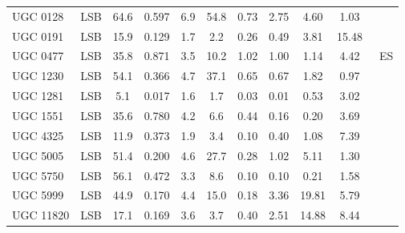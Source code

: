 \documentclass[preprint,aps]{revtex4}
\begin{document}
\begin{table}
\begin{tabular}{l c c c c c c c c c c}
\\
UGC 0128 &LSB&  64.6 &    0.597  &  6.9 & 54.8 & 0.73 & 2.75 & \phantom{0}4.60 & \phantom{0}1.03 &  \cite{Verheijen1999} \cite{deBlok1997} \cite{vanderHulst1993} \cite{vanderHulst1993}     
\\
UGC 0191 &LSB &15.9 &  0.129    & 1.7 & \phantom{0}2.2 & 0.26 & 0.49 &\phantom{0}3.81 &15.48 &   \cite{Kuzio2008} \cite{vanZee2000} \cite{vanZee2000} \cite{vanZee1997}    
\\
UGC 0477 & LSB &35.8 &  0.871    &3.5 &10.2 & 1.02& 1.00 & \phantom{0}1.14 & \phantom{0}4.42 &     \cite{Kuzio2006} \cite{Fisher1981} ~ES   \cite{Fisher1981}
\\
UGC 1230 &LSB& 54.1&   0.366   & 4.7 & 37.1 & 0.65 & 0.67 &\phantom{0}1.82 & \phantom{0}0.97 &    \cite{deBlok1997} \cite{deBlok1997} \cite{vanderHulst1993} \cite{vanderHulst1993}
\\
UGC 1281 & LSB & \phantom{0}5.1 &0.017& 1.6& \phantom{0}1.7 &0.03&0.01 & \phantom{0}0.53 &\phantom{0}3.02 &    \cite{Kuzio2006} \cite{deBlok2002} \cite{deBlok2002} \cite{Swaters2002a}    
\\
UGC 1551 &LSB & 35.6 &   0.780   & 4.2 & \phantom{0}6.6 & 0.44 & 0.16 &\phantom{0}0.20 & \phantom{0}3.69 &    \cite{Kuzio2008} \cite{Swaters2002b} \cite{deJong1996} \cite{Swaters2002b}    
\\
UGC 4325 &LSB& 11.9 &  0.373    & 1.9 & \phantom{0}3.4 & 0.10 &0.40 & \phantom{0}1.08 & \phantom{0}7.39&   \cite{Kuzio2008} \cite{Swaters2002a} \cite{deBlok2002} \cite{Swaters2002a}    
\\
UGC 5005 & LSB & 51.4 &   0.200   &  4.6 & 27.7 &0.28 &1.02&\phantom{0}5.11 &\phantom{0}1.30 &  \cite{deBlok1997} \cite{deBlok1997}  \cite{vanderHulst1993} \cite{vanderHulst1993}     
\\
UGC 5750 &LSB &56.1 &   0.472   &3.3 &\phantom{0}8.6 & 0.10 & 0.10 & \phantom{0}0.21 & \phantom{0}1.58 &\cite{Kuzio2006} \cite{deBlok1997}  \cite{vanderHulst1993}  \cite{vanderHulst1993}  
\\
UGC 5999 & LSB & 44.9 &   0.170   &4.4 & 15.0 & 0.18 & 3.36 &19.81 & \phantom{0}5.79 & \cite{deBlok1997} \cite{deBlok1997}  \cite{vanderHulst1993} \cite{vanderHulst1993}     
\\
UGC 11820 & LSB & 17.1 &   0.169   & 3.6 & \phantom{0}3.7 &0.40  & 2.51 & 14.88 &\phantom{0}8.44 &   \cite{Kuzio2008} \cite{vanZee1997} \cite{Kim2007}  \cite{vanZee1997}   
\\
\hline
\end{tabular}
\label{table:lsb20}
\end{table}
\end{document}

